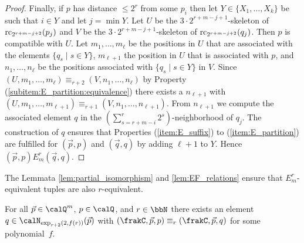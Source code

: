 \begin{proof}
	
	Finally, if $p$ has distance $\leq 2^{r}$ from some $p_i$ then let $Y\in \{X_1,\ldots,X_k\}$ be such that $i\in Y$ and let $j=\min Y$. Let $U$ be the $3\cdot 2^{r+m-j+1}$-skeleton of $\operatorname{rc}_{2^{r+m-j+2}}(p_j)$ and 
	$V$ be the $3\cdot 2^{r+m-j+1}$-skeleton of $\operatorname{rc}_{2^{r+m-j+2}}(q_j)$.
	Then $p$ is compatible with $U$. Let $m_1,\ldots,m_\ell$ be the positions in $U$ that are associated with the elements $\{q_s \mid s\in Y\}$, $m_{\ell+1}$ the position in $U$ that is associated with $p$, and $n_1,\ldots,n_\ell$ be the positions associated with $\{q_s \mid s\in Y\}$ in $V$. Since $(U,m_1,\ldots,m_\ell) \equiv_{r+2} (V,n_1,\ldots,n_\ell)$ by Property (\ref{subitem:E_partition:equivalence}) there exists a $n_{\ell+1}$ with $(U,m_1,\ldots,m_{\ell+1}) \equiv_{r+1} (V,n_1,\ldots,n_{\ell+1})$. From $n_{\ell+1}$ we compute the associated element $q$
	in the $(\sum_{s= r+m-i}^{r} 2^s)$-neighborhood of $q_j$.
	The construction of $q$ ensures that Properties (\ref{item:E_suffix}) to (\ref{item:E_partition}) are fulfilled for $(\vec{p}, p)$ and $(\vec{q}, q)$ by adding $\ell+1$ to $Y$. Hence $(\vec{p}, p) E^r_m (\vec{q}, q)$.
\end{proof}

The Lemmata \ref{lem:partial_isomorphism} and \ref{lem:EF_relations} ensure that $E^r_m$-equivalent tuples are also $r$-equivalent.

\begin{corollary}\label{cor:equivalence}
	For all $\vec{p}\in \Qx^m$, $p\in \Qx$, and $r\in\bbN$ there exists an element $q\in \calN_{\exp_{r+2}(2,f(r))}(\vec{p})$ with $(\frakC, \vec{p}, p) \equiv_r (\frakC,\vec{p}, q)$ for some polynomial~$f$.
\end{corollary}


